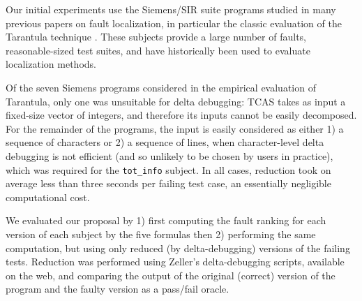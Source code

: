 \begin{table}
\begin{center}
\end{center}
\caption{SIR Fault Rank Change Result Frequencies}
\label{tab:avgimproved}
\vspace{-5mm}
\end{table}

Our initial experiments use the Siemens/SIR \cite{doESE05,Siemens}
suite programs studied in many previous papers on fault localization,
in particular the classic evaluation of the Tarantula technique
\cite{Tarantula}.  These subjects provide a large number of faults,
reasonable-sized test suites, and have historically been used to
evaluate localization methods.

Of the seven Siemens programs considered in the empirical evaluation
of Tarantula, only one was unsuitable for delta debugging: TCAS takes
as input a fixed-size vector of integers, and therefore its inputs
cannot be easily decomposed.  For the remainder of the programs, the
input is easily considered as either 1) a sequence of characters or 2)
a sequence of lines, when character-level delta debugging is not
efficient (and so unlikely to be chosen by users in practice), which
was required for the {\tt tot\_info} subject.  In all cases, reduction
took on average less than three seconds per failing test case, an essentially
negligible computational cost.



We evaluated our proposal by 1) first computing the fault ranking for
each version of each subject by the five formulas then 2) performing
the same computation, but using only reduced (by delta-debugging)
versions of the failing tests.  Reduction was performed using Zeller's
delta-debugging scripts, available on the web, and comparing the output
of the original (correct) version of the program and the faulty
version as a pass/fail oracle.

